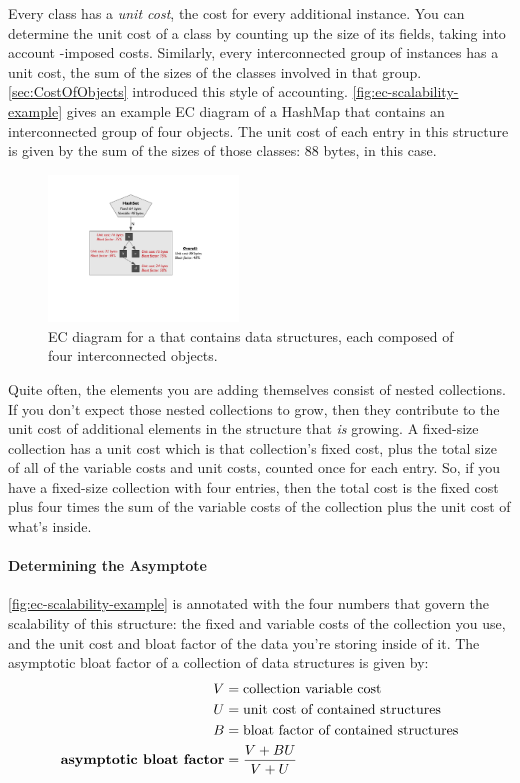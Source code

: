 Every class has a \emph{unit cost}, the cost for every additional instance. You
can determine the unit cost of a class by counting up the size of its fields,
taking into account \jre-imposed costs. Similarly, every interconnected group of
instances has a unit cost, the sum of the sizes of the classes involved in that
group. \autoref{sec:CostOfObjects} introduced this style of accounting.
\autoref{fig:ec-scalability-example} gives an example EC diagram of a HashMap
that contains an interconnected group of four objects. The unit cost of each
entry in this structure is given by the sum of the sizes of those classes: 88
bytes, in this case.
\begin{figure}
\centering
\includegraphics[width=0.45\textwidth]{part3/Figures/assessing/EC-example}
\caption{EC diagram for a  that contains data structures, each
composed of four interconnected objects.}
\label{fig:ec-scalability-example}
\end{figure}

Quite often, the elements you are adding themselves consist of nested
collections. If you don't expect those nested collections to grow, then they
contribute to the unit cost of additional elements in the structure that
\emph{is} growing. A fixed-size collection has a unit cost which is that
collection's fixed cost, plus the total size of all of the variable costs and
unit costs, counted once for each entry. So, if you have a fixed-size collection
with four entries, then the total cost is the fixed cost plus four times the sum
of the variable costs of the collection plus the unit cost of what's inside.


\paragraph{Determining the Asymptote}
\autoref{fig:ec-scalability-example} is annotated with the four numbers that
govern the scalability of this structure: the fixed and variable costs of the
collection you use, and the unit cost and bloat factor of the data you're
storing inside of it. The asymptotic bloat factor of a collection of data
structures is given by:
\begin{align*}
V &= \textrm{collection variable cost} \\
U &= \textrm{unit cost of contained structures} \\
B &= \textrm{bloat factor of contained structures} \\
\textbf{\textrm{asymptotic bloat factor}} &= \frac{V + B U}{V + U}
\end{align*}

